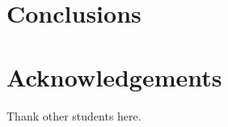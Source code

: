 \section{Conclusions}
\label{sec-conclusions}

\section*{Acknowledgements}

 Thank other students here.
